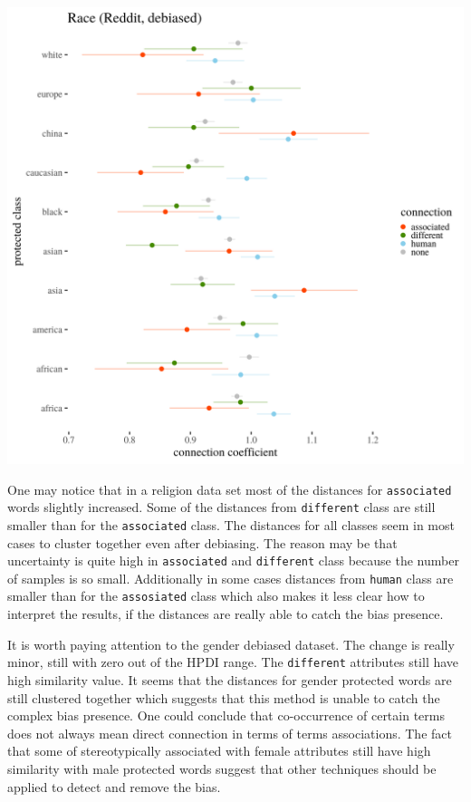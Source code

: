 \documentclass[
  12pt,
]{book}
\begin{document}
\includegraphics[width=14cm]{../images/visDebRaceReddit.png}

One may notice that in a religion data set most of the distances for \texttt{associated} words slightly increased. Some of the distances from \texttt{different} class are still smaller than for the \texttt{associated} class. The distances for all classes seem in most cases to cluster together even after debiasing. The reason may be that uncertainty is quite high in \texttt{associated} and \texttt{different} class because the number of samples is so small. Additionally in some cases distances from \texttt{human} class are smaller than for the \texttt{assosiated} class which also makes it less clear how to interpret the results, if the distances are really able to catch the bias presence.

It is worth paying attention to the gender debiased dataset. The change is really minor, still with zero out of the HPDI range. The \texttt{different} attributes still have high similarity value. It seems that the distances for gender protected words are still clustered together which suggests that this method is unable to catch the complex bias presence. One could conclude that co-occurrence of certain terms does not always mean direct connection in terms of terms associations. The fact that some of stereotypically associated with female attributes still have high similarity with male protected words suggest that other techniques should be applied to detect and remove the bias.
\end{document}
